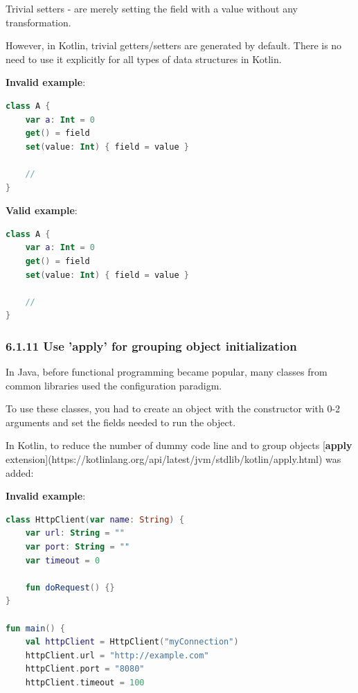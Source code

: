 {{{{{{{{{{{{{{{{{{{{Trivial setters - are merely setting the field with a value without any transformation.

However, in Kotlin, trivial getters/setters are generated by default. There is no need to use it explicitly for all types of data structures in Kotlin.



\textbf{Invalid example}:

\begin{lstlisting}[language=Kotlin]
class A {
    var a: Int = 0 
    get() = field
    set(value: Int) { field = value }

    //
}
\end{lstlisting}


\textbf{Valid example}:

\begin{lstlisting}[language=Kotlin]
class A {
    var a: Int = 0 
    get() = field
    set(value: Int) { field = value }

    //
}
\end{lstlisting}


\subsubsection*{\textbf{6.1.11 Use 'apply' for grouping object initialization}}
\leavevmode\newline

\label{sec:6.1.11}

In Java, before functional programming became popular, many classes from common libraries used the configuration paradigm.

To use these classes, you had to create an object with the constructor with 0-2 arguments and set the fields needed to run the object.

In Kotlin, to reduce the number of dummy code line and to group objects [\textbf{apply} extension](https://kotlinlang.org/api/latest/jvm/stdlib/kotlin/apply.html) was added:  

 

\textbf{Invalid example}:

\begin{lstlisting}[language=Kotlin]
class HttpClient(var name: String) {
    var url: String = ""
    var port: String = ""
    var timeout = 0
    
    fun doRequest() {}
}

fun main() {
    val httpClient = HttpClient("myConnection")
    httpClient.url = "http://example.com"
    httpClient.port = "8080"
    httpClient.timeout = 100
    

\end{lstlisting}}}}}}}}}}}}}}}}}}}}}
